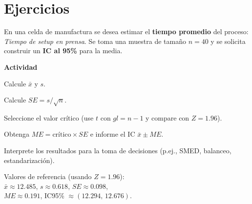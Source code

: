 \section{Ejercicios}


\begin{ejercicio}[Tiempo de \emph{setup} en prensa (n=40)]
En una celda de manufactura se desea estimar el \textbf{tiempo promedio} del proceso: \emph{Tiempo de \emph{setup} en prensa}.
Se toma una muestra de tamaño $n=40$ y se solicita construir un \textbf{IC al 95\%} para la media.


\textbf{Actividad}
\begin{pasos}
  \item Calcule $\bar{x}$ y $s$.
  \item Calcule $SE = s/\sqrt{n}$.
  \item Seleccione el valor crítico (use $t$ con $gl=n-1$ y compare con $Z=1.96$).
  \item Obtenga $ME=\text{crítico}\times SE$ e informe el IC $\bar{x}\pm ME$.
  \item Interprete los resultados para la toma de decisiones (p.ej., SMED, balanceo, estandarización).
\end{pasos}

\begin{clave}
\noindent Valores de referencia (usando $Z=1.96$):\\
$\bar{x} \approx 12.485$, \quad $s \approx 0.618$, \quad $SE \approx 0.098$,\\
$ME \approx 0.191$, \quad IC95\% $\approx (12.294,\, 12.676)$.
\end{clave}
\end{ejercicio}


